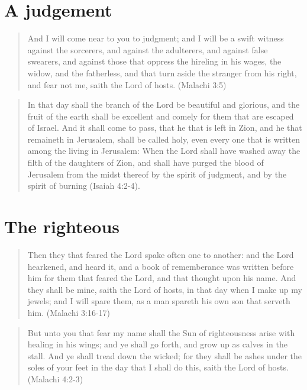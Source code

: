 \section{A judgement}

\begin{quotation}
And I will come near to you to judgment; and I will be a swift witness against the sorcerers, and against the adulterers, and against false swearers, and against those that oppress the hireling in his wages, the widow, and the fatherless, and that turn aside the stranger from his right, and fear not me, saith the Lord of hosts. (Malachi 3:5)
\end{quotation}

\begin{quotation}
In that day shall the branch of the Lord be beautiful and glorious, and the fruit of the earth shall be excellent and comely for them that are escaped of Israel. And it shall come to pass, that he that is left in Zion, and he that remaineth in Jerusalem, shall be called holy, even every one that is written among the living in Jerusalem: When the Lord shall have washed away the filth of the daughters of Zion, and shall have purged the blood of Jerusalem from the midst thereof by the spirit of judgment, and by the spirit of burning (Isaiah 4:2-4).
\end{quotation}


\section{The righteous}

\begin{quotation}
Then they that feared the Lord spake often one to another: and the Lord hearkened, and heard it, and a book of rememberance was written before him for them that feared the Lord, and that thought upon his name. And they shall be mine, saith the Lord of hosts, in that day when I make up my jewels; and I will spare them, as a man spareth his own son that serveth him. (Malachi 3:16-17)
\end{quotation}

\begin{quotation}
But unto you that fear my name shall the Sun of righteousness arise with healing in his wings; and ye shall go forth, and grow up as calves in the stall. And ye shall tread down the wicked; for they shall be ashes under the soles of your feet in the day that I shall do this, saith the Lord of hosts. (Malachi 4:2-3)
\end{quotation}

